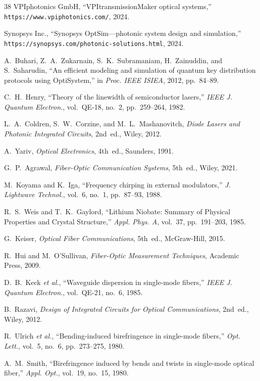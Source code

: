 \documentclass[3p,times,preprint]{elsarticle}
\begin{document}
\begin{thebibliography}{38}
VPIphotonics GmbH, ``VPItransmissionMaker optical systems,''
\texttt{https://www.vpiphotonics.com/}, 2024.

Synopsys Inc., ``Synopsys OptSim---photonic system design and
simulation,'' \texttt{https://synopsys.com/photonic-solutions.html},
2024.

A.~Buhari, Z.~A.~Zukarnain, S.~K.~Subramaniam, H.~Zainuddin,
and S.~Saharudin, ``An efficient modeling and simulation of quantum
key distribution protocols using OptiSystem,'' in \textit{Proc. IEEE
ISIEA}, 2012, pp.~84--89.

C.~H.~Henry, ``Theory of the linewidth of semiconductor lasers,''
\textit{IEEE J. Quantum Electron.}, vol.~QE-18, no.~2, pp.~259--264, 1982.

L.~A.~Coldren, S.~W.~Corzine, and M.~L.~Mashanovitch,
\textit{Diode Lasers and Photonic Integrated Circuits}, 2nd~ed.,
Wiley, 2012.

A.~Yariv, \textit{Optical Electronics}, 4th~ed., Saunders, 1991.

G.~P.~Agrawal, \textit{Fiber-Optic Communication Systems}, 5th~ed.,
Wiley, 2021.

M.~Koyama and K.~Iga, ``Frequency chirping in external modulators,''
\textit{J. Lightwave Technol.}, vol.~6, no.~1, pp.~87--93, 1988.

R.~S.~Weis and T.~K.~Gaylord, ``Lithium Niobate: Summary of Physical
Properties and Crystal Structure,'' \textit{Appl. Phys. A}, vol.~37,
pp.~191--203, 1985.

G.~Keiser, \textit{Optical Fiber Communications}, 5th~ed., McGraw-Hill,
2015.

R.~Hui and M.~O'Sullivan, \textit{Fiber-Optic Measurement Techniques},
Academic Press, 2009.

D.~B.~Keck \textit{et al.}, ``Waveguide dispersion in single-mode fibers,''
\textit{IEEE J. Quantum Electron.}, vol.~QE-21, no.~6, 1985.

B.~Razavi, \textit{Design of Integrated Circuits for Optical
Communications}, 2nd~ed., Wiley, 2012.

R.~Ulrich \textit{et al.}, ``Bending-induced birefringence in single-mode
fibers,'' \textit{Opt. Lett.}, vol.~5, no.~6, pp.~273--275, 1980.

A.~M.~Smith, ``Birefringence induced by bends and twists in single-mode
optical fiber,'' \textit{Appl. Opt.}, vol.~19, no.~15, 1980.


\end{thebibliography}
\end{document}
